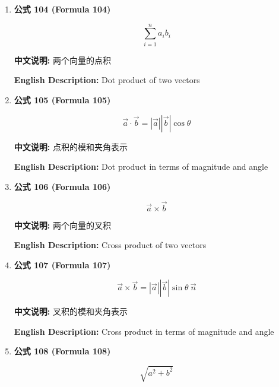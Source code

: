 \documentclass[12pt,a4paper]{article}
\begin{document}
\begin{enumerate}[leftmargin=*]
\item \textbf{公式 104 (Formula 104)}

\begin{equation}
\sum_{i=1}^{n} a_i b_i
\end{equation}

\textbf{中文说明:} 两个向量的点积

\textbf{English Description:} Dot product of two vectors

\vspace{0.5cm}

\item \textbf{公式 105 (Formula 105)}

\begin{equation}
\vec{a} \cdot \vec{b} = |\vec{a}| |\vec{b}| \cos \theta
\end{equation}

\textbf{中文说明:} 点积的模和夹角表示

\textbf{English Description:} Dot product in terms of magnitude and angle

\vspace{0.5cm}

\item \textbf{公式 106 (Formula 106)}

\begin{equation}
\vec{a} \times \vec{b}
\end{equation}

\textbf{中文说明:} 两个向量的叉积

\textbf{English Description:} Cross product of two vectors

\vspace{0.5cm}

\item \textbf{公式 107 (Formula 107)}

\begin{equation}
\vec{a} \times \vec{b} = |\vec{a}| |\vec{b}| \sin \theta\ \vec{n}
\end{equation}

\textbf{中文说明:} 叉积的模和夹角表示

\textbf{English Description:} Cross product in terms of magnitude and angle

\vspace{0.5cm}

\item \textbf{公式 108 (Formula 108)}

\begin{equation}
\sqrt{a^2 + b^2}
\end{equation}


\end{enumerate}
\end{document}
